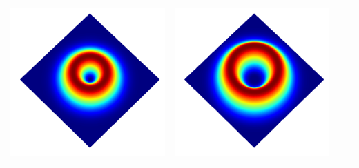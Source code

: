 \documentclass[a4paper, 12pt]{article}
\begin{document}
\begin{center}
\begin{tabular}{M{1.5cm}M{5cm}M{5cm}M{5cm}}
\includegraphics[width=\linewidth]{../resources/intensity_M=1.png} & 
\includegraphics[width=\linewidth]{../resources/intensity_M=2.png}\\
\end{tabular}
\end{center}
\end{document}
